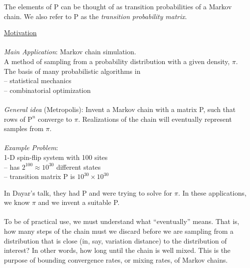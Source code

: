 \documentclass{slides}
\newcommand{\Prob}{\mbox{P}}
\begin{document}
\begin{note}
The elements of P can
be thought of as transition probabilities of a Markov chain. 
We also refer to P as the \emph{transition probability matrix}.
\end{note}

\begin{slide}
\underline{Motivation}\\\\
{\it Main Application}: Markov chain simulation.\\
A method of sampling from a probability distribution 
with a given density, $\pi$.  \\
The basis of many probabilistic algorithms in\\
-- statistical mechanics\\
-- combinatorial optimization  
\\\\
{\it General idea} (Metropolis):
Invent a Markov chain with a matrix P, such that rows 
of $\Prob^n$ converge to $\pi$.  Realizations of the chain will 
eventually represent samples from $\pi$.
\\\\
{\it Example Problem}:\\
1-D spin-flip system with 100 sites\\
-- has $2^{100} \approx 10^{30}$ different states\\
-- transition matrix P is $10^{30} \times 10^{30}$
\end{slide}

\begin{note}
In Dayar's talk, they had P and were trying to solve for $\pi$.
In these applications, we know $\pi$ and we invent a suitable P.
\\\\
To be of practical use, we must understand what ``eventually'' means.  
That is, how many steps of the chain must we 
discard before we are sampling from a distribution that is
close (in, say, variation distance) to the distribution of interest?  
In other words, how long until the chain is well mixed.  
This is the purpose of bounding convergence rates, or mixing rates,
of Markov chains.
\end{note}
\end{document}

